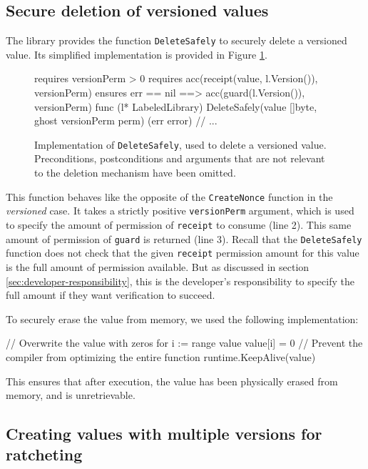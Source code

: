 \subsection{Secure deletion of versioned values}
\label{sec:secure-deletion-of-versioned-values}

The library provides the function \texttt{DeleteSafely} to securely delete a versioned value. Its simplified implementation is provided in Figure \ref{lst:delete-safely}.

\begin{figure}
    \begin{gobra}
requires versionPerm > 0
requires acc(receipt(value, l.Version()), versionPerm)
ensures  err == nil ==> acc(guard(l.Version()), versionPerm)
func (l* LabeledLibrary) DeleteSafely(value []byte,
                                ghost versionPerm perm) (err error) {
    // ...
}
    \end{gobra}
    \caption{Implementation of \texttt{DeleteSafely}, used to delete a versioned value. Preconditions, postconditions and arguments that are not relevant to the deletion mechanism have been omitted.}
    \label{lst:delete-safely}
\end{figure}

This function behaves like the opposite of the \texttt{CreateNonce} function in the \emph{versioned} case.
It takes a strictly positive \texttt{versionPerm} argument, which is used to specify the amount of permission of \texttt{receipt} to consume (line 2).
This same amount of permission of \texttt{guard} is returned (line 3).
Recall that the \texttt{DeleteSafely} function does not check that the given \texttt{receipt} permission amount for this value is the full amount of permission available.
But as discussed in section \ref{sec:developer-responsibility}, this is the developer's responsibility to specify the full amount if they want verification to succeed.

To securely erase the value from memory, we used the following implementation:
\begin{gobra}
// Overwrite the value with zeros
for i := range value {
    value[i] = 0
}
// Prevent the compiler from optimizing the entire function
runtime.KeepAlive(value)
\end{gobra}
This ensures that after execution, the value has been physically erased from memory, and is unretrievable.

\subsection{Creating values with multiple versions for ratcheting}
\label{sec:creating-values-with-multiple-versions-for-ratcheting}

